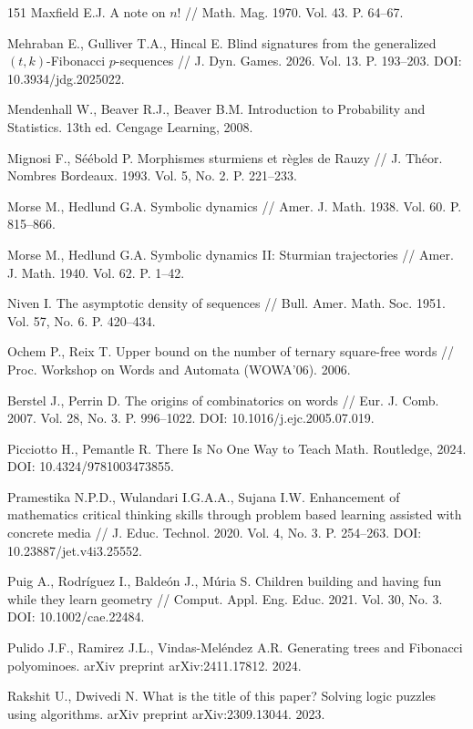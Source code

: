 \documentclass[a4paper,14pt]{extreport}
\theoremstyle{plain}
\theoremstyle{definition}
\theoremstyle{remark}
\begin{document}
\begin{thebibliography}{151}
		Maxfield E.J. A note on $n!$ // Math. Mag. 1970. Vol. 43. P. 64--67.
		
		Mehraban E., Gulliver T.A., Hincal E. Blind signatures from the generalized $(t,k)$-Fibonacci $p$-sequences // J. Dyn. Games. 2026. Vol. 13. P. 193--203. DOI: 10.3934/jdg.2025022.
		
		Mendenhall W., Beaver R.J., Beaver B.M. Introduction to Probability and Statistics. 13th ed. Cengage Learning, 2008.
		
		Mignosi F., Séébold P. Morphismes sturmiens et règles de Rauzy // J. Théor. Nombres Bordeaux. 1993. Vol. 5, No. 2. P. 221--233.
		
		Morse M., Hedlund G.A. Symbolic dynamics // Amer. J. Math. 1938. Vol. 60. P. 815--866.
		
		Morse M., Hedlund G.A. Symbolic dynamics II: Sturmian trajectories // Amer. J. Math. 1940. Vol. 62. P. 1--42.
		
		Niven I. The asymptotic density of sequences // Bull. Amer. Math. Soc. 1951. Vol. 57, No. 6. P. 420--434.
		
		Ochem P., Reix T. Upper bound on the number of ternary square-free words // Proc. Workshop on Words and Automata (WOWA'06). 2006.
		
		Berstel J., Perrin D. The origins of combinatorics on words // Eur. J. Comb. 2007. Vol. 28, No. 3. P. 996--1022. DOI: 10.1016/j.ejc.2005.07.019.
		
		Picciotto H., Pemantle R. There Is No One Way to Teach Math. Routledge, 2024. DOI: 10.4324/9781003473855.
		
		Pramestika N.P.D., Wulandari I.G.A.A., Sujana I.W. Enhancement of mathematics critical thinking skills through problem based learning assisted with concrete media // J. Educ. Technol. 2020. Vol. 4, No. 3. P. 254--263. DOI: 10.23887/jet.v4i3.25552.
		
		Puig A., Rodríguez I., Baldeón J., Múria S. Children building and having fun while they learn geometry // Comput. Appl. Eng. Educ. 2021. Vol. 30, No. 3. DOI: 10.1002/cae.22484.
		
		Pulido J.F., Ramirez J.L., Vindas-Meléndez A.R. Generating trees and Fibonacci polyominoes. arXiv preprint arXiv:2411.17812. 2024.
		
		Rakshit U., Dwivedi N. What is the title of this paper? Solving logic puzzles using algorithms. arXiv preprint arXiv:2309.13044. 2023.
		

\end{thebibliography}
\end{document}
